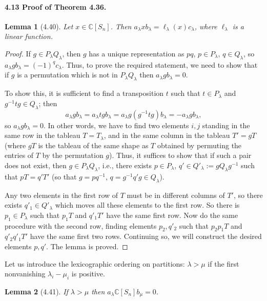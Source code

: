 \documentclass[UTF8,11pt]{ctexart}
\newtheorem*{lemma}{Lemma}
\theoremstyle{definition}
\newcommand{\C}{\mathbb C}
\begin{document}
\paragraph{4.13 Proof of Theorem 4.36.}
\begin{lemma}[4.40]
Let $x\in\C[S_n]$. Then $a_\lambda xb_\lambda=\ell_\lambda(x)c_\lambda$, where $\ell_\lambda$ is a linear function.
\end{lemma}
\begin{proof}
If $g\in P_\lambda Q_\lambda$, then $g$ has a unique representation as $pq$, $p\in P_\lambda$, $q\in Q_\lambda$, so $a_\lambda gb_\lambda=(-1)^q c_\lambda$. Thus, to prove the required statement, we need to show that if $g$ is a permutation which is not in $P_\lambda Q_\lambda$ then $a_\lambda gb_\lambda=0$.

To show this, it is sufficient to find a transposition $t$ such that $t\in P_\lambda$ and $g^{-1}tg\in Q_\lambda$; then
\[
a_\lambda gb_\lambda=a_\lambda tgb_\lambda
=a_\lambda g(g^{-1}tg)b_\lambda=-a_\lambda gb_\lambda,
\]
so $a_\lambda gb_\lambda=0$. In other words, we have to find two elements $i,j$ standing in the same row in the tableau $T=T_\lambda$, and in the same column in the tableau $T'=gT$ (where $gT$ is the tableau of the same shape as $T$ obtained by permuting the entries of $T$ by the permutation $g$). Thus, it suffices to show that if such a pair does not exist, then $g\in P_\lambda Q_\lambda$, i.e., there exists $p\in P_\lambda$, $q'\in Q'_\lambda:=gQ_\lambda g^{-1}$ such that $pT=q'T'$ (so that $g=pq^{-1}$, $q=g^{-1}q'g\in Q_\lambda$).

Any two elements in the first row of $T$ must be in different columns of $T'$, so there exists $q'_1\in Q'_\lambda$ which moves all these elements to the first row. So there is $p_1\in P_\lambda$ such that $p_1T$ and $q'_1T'$ have the same first row. Now do the same procedure with the second row, finding elements $p_2,q'_2$ such that $p_2p_1T$ and $q'_2q'_1T'$ have the same first two rows. Continuing so, we will construct the desired elements $p,q'$. The lemma is proved.
\end{proof}
Let us introduce the lexicographic ordering on partitions: $\lambda>\mu$ if the first nonvanishing $\lambda_i-\mu_i$ is positive.
\begin{lemma}[4.41]
If $\lambda>\mu$ then $a_\lambda\C[S_n]b_\mu=0$.
\end{lemma}
\end{document}
